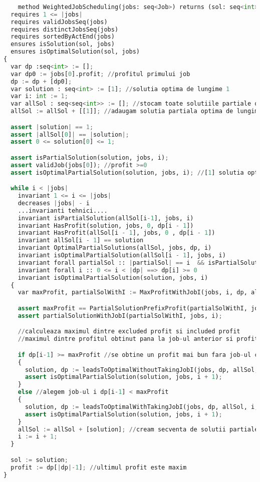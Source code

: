 \begin{lstlisting}[language=Python]
    
    method WeightedJobScheduling(jobs: seq<Job>) returns (sol: seq<int>, profit : int)
  requires 1 <= |jobs|
  requires validJobsSeq(jobs)
  requires distinctJobsSeq(jobs)
  requires sortedByActEnd(jobs)
  ensures isSolution(sol, jobs)
  ensures isOptimalSolution(sol, jobs)
{
  var dp :seq<int> := [];
  var dp0 := jobs[0].profit; //profitul primului job
  dp := dp + [dp0];
  var solution : seq<int> := [1]; //solutia optima de lungime 1
  var i: int := 1;
  var allSol : seq<seq<int>> := []; //stocam toate solutiile partiale optime
  allSol := allSol + [[1]]; //adaugam solutia partiala optima de lungime 1

  assert |solution| == 1;
  assert |allSol[0]| == |solution|;
  assert 0 <= solution[0] <= 1;

  assert isPartialSolution(solution, jobs, i);
  assert validJob(jobs[0]); //profit >=0
  assert isOptimalPartialSolution(solution, jobs, i); //[1] solutia optima de lungime 1

  while i < |jobs|
    invariant 1 <= i <= |jobs|
    decreases |jobs| - i
    ...invarianti tehnici....
    invariant isPartialSolution(allSol[i-1], jobs, i)
    invariant HasProfit(solution, jobs, 0, dp[i - 1])
    invariant HasProfit(allSol[i - 1], jobs, 0 , dp[i - 1])
    invariant allSol[i - 1] == solution
    invariant OptimalPartialSolutions(allSol, jobs, dp, i)
    invariant isOptimalPartialSolution(allSol[i - 1], jobs, i)   
    invariant forall partialSol :: |partialSol| == i  && isPartialSolution(partialSol, jobs, i) ==> HasLessProfit(partialSol, jobs, dp[i - 1], 0); //sol par optima
    invariant forall i :: 0 <= i < |dp| ==> dp[i] >= 0
    invariant isOptimalPartialSolution(solution, jobs, i)
  {
    var maxProfit, partialSolWithI := MaxProfitWithJobI(jobs, i, dp, allSol);

    assert maxProfit == PartialSolutionPrefixProfit(partialSolWithI, jobs, 0);
    assert partialSolutionWithJobI(partialSolWithI, jobs, i);

    //calculeaza maximul dintre excluded profit si included profit
    //maximul dintre profitul obtinut pana la job-ul anterior si profitul obtinut cu adugarea job-ului curent

    if dp[i-1] >= maxProfit //se obtine un profit mai bun fara job-ul curent
    {
      solution, dp := leadsToOptimalWithoutTakingJobI(jobs, dp, allSol, i, maxProfit, solution);
      assert isOptimalPartialSolution(solution, jobs, i + 1);
    }
    else //alegem job-ul i dp[i-1] < maxProfit
    {
      solution, dp := leadsToOptimalWithTakingJobI(jobs, dp, allSol, i, maxProfit, partialSolWithI);
      assert isOptimalPartialSolution(solution, jobs, i + 1);
    }
    allSol := allSol + [solution]; //cream secventa de solutii partiale optime
    i := i + 1;
  }

  sol := solution;
  profit := dp[|dp|-1]; //ultimul profit este maxim
}
\end{lstlisting}
